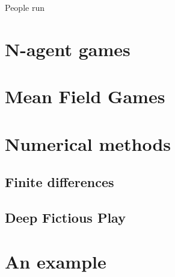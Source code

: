 People run
\section{N-agent games}
\section{Mean Field Games}
\section{Numerical methods}
\subsection{Finite differences}
\subsection{Deep Fictious Play}
\section{An example}
